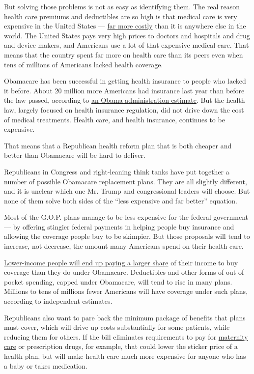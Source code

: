But solving those problems is not as easy as identifying them. The real
reason health care premiums and deductibles are so high is that medical
care is very expensive in the United States ---
\href{http://stats.oecd.org/Index.aspx?DataSetCode=SHA}{far more costly}
than it is anywhere else in the world. The United States pays very high
prices to doctors and hospitals and drug and device makers, and
Americans use a lot of that expensive medical care. That means that the
country spent far more on health care than its peers even when tens of
millions of Americans lacked health coverage.

Obamacare has been successful in getting health insurance to people who
lacked it before. About 20 million more Americans had insurance last
year than before the law passed, according to
\href{https://aspe.hhs.gov/sites/default/files/pdf/187551/ACA2010-2016.pdf}{an
Obama administration estimate}. But the health law, largely focused on
health insurance regulation, did not drive down the cost of medical
treatments. Health care, and health insurance, continues to be
expensive.

That means that a Republican health reform plan that is both cheaper and
better than Obamacare will be hard to deliver.

Republicans in Congress and right-leaning think tanks have put together
a number of possible Obamacare replacement plans. They are all slightly
different, and it is unclear which one Mr. Trump and congressional
leaders will choose. But none of them solve both sides of the ``less
expensive and far better'' equation.

Most of the G.O.P. plans manage to be less expensive for the federal
government --- by offering stingier federal payments in helping people
buy insurance and allowing the coverage people buy to be skimpier. But
those proposals will tend to increase, not decrease, the amount many
Americans spend on their health care.

\href{https://www.nytimes.com/2015/08/20/upshot/walker-and-rubio-health-proposals-are-less-concerned-about-poor.html}{Lower-income
people will end up paying a larger share} of their income to buy
coverage than they do under Obamacare. Deductibles and other forms of
out-of-pocket spending, capped under Obamacare, will tend to rise in
many plans. Millions to tens of millions fewer Americans will have
coverage under such plans, according to independent estimates.

Republicans also want to pare back the minimum package of benefits that
plans must cover, which will drive up costs substantially for some
patients, while reducing them for others. If the bill eliminates
requirements to pay for
\href{http://www.theatlantic.com/politics/archive/2013/11/why-is-maternity-care-such-an-issue-for-obamacare-opponents/281396/}{maternity
care} or prescription drugs, for example, that could lower the sticker
price of a health plan, but will make health care much more expensive
for anyone who has a baby or takes medication.

